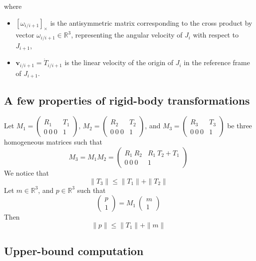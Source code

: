 \documentclass {article}
\newcommand\linvel{\textbf{v}}
\newcommand\reals{\mathbb{R}}
\newcommand\crossprod[1]{\left[#1\right]_{\times}}
\begin{document}
where
\begin{itemize}
\item $\crossprod{\omega_{i/i+1}}$ is the antisymmetric matrix
  corresponding to the cross product by vector
  $\omega_{i/i+1}\in\reals^3$, representing the angular velocity of
  $J_i$ with respect to $J_{i+1}$,
\item $\linvel_{i/i+1} = \dot{T}_{i/i+1}$ is the linear velocity of the origin of
$J_i$ in the reference frame of $J_{i+1}$.
\end{itemize}

\subsection {A few properties of rigid-body transformations}

Let $M_1=\left(\begin{array}{cc}R_1 & T_1\\0\ 0\ 0 & 1\end{array}\right)$,
$M_2=\left(\begin{array}{cc}R_2 & T_2\\0\ 0\ 0 & 1\end{array}\right)$, and
$M_3=\left(\begin{array}{cc}R_3 & T_3\\0\ 0\ 0 & 1\end{array}\right)$ be three homogeneous matrices such that
$$
M_3 = M_1 M_2 = \left(\begin{array}{cc}R_1\ R_2 & R_1\ T_2 + T_1\\0\ 0\ 0 & 1\end{array}\right)
$$
We notice that
\begin{equation}\label{eq:ineq1}
\|T_3\| \leq \|T_1\| + \|T_2\|
\end{equation}
Let $m\in\reals^3$, and $p\in\reals^3$ such that
$$
\left(\begin{array}{c}p\\1\end{array}\right) = M_1\ \left(\begin{array}{c}m\\1\end{array}\right)
$$
Then
\begin{equation}\label{eq:ineq2}
\|p\| \leq \|T_1\| + \|m\|
\end{equation}

\subsection {Upper-bound computation}
\end{document}
